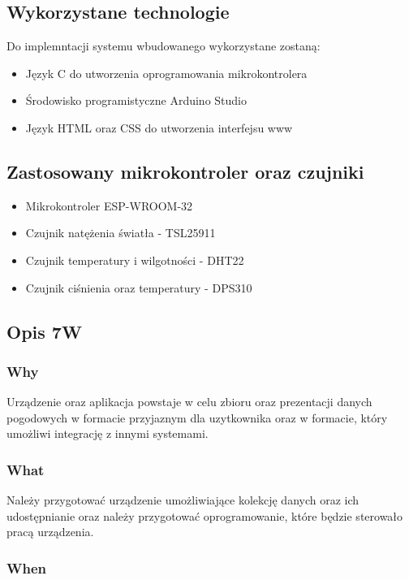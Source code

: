 \documentclass[12pt,a4paper]{article}
\begin{document}
\subsection{Wykorzystane technologie}
Do implemntacji systemu wbudowanego wykorzystane zostaną:
\begin{itemize}
    \item Język C do utworzenia oprogramowania mikrokontrolera
    \item Środowisko programistyczne Arduino Studio
    \item Język HTML oraz CSS do utworzenia interfejsu www
\end{itemize}

\subsection{Zastosowany mikrokontroler oraz czujniki} \label{list_of_components}

\begin{itemize}
    \item Mikrokontroler ESP-WROOM-32
    \item Czujnik natężenia światła - TSL25911
    \item Czujnik temperatury i wilgotności - DHT22
    \item Czujnik ciśnienia oraz temperatury - DPS310
\end{itemize}

\subsection{Opis 7W}

\subsubsection{Why}
Urządzenie oraz aplikacja powstaje w celu zbioru oraz prezentacji danych pogodowych w formacie przyjaznym dla uzytkownika oraz w formacie, który
umożliwi integrację z innymi systemami.

\subsubsection{What}
Należy przygotować urządzenie umożliwiające kolekcję danych oraz ich udostępnianie oraz należy przygotować oprogramowanie, które będzie 
sterowało pracą urządzenia.

\subsubsection{When}
\end{document}
